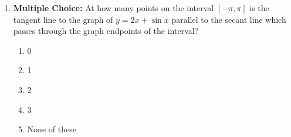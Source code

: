 \documentclass[12pt]{article}
\newif\ifans
\begin{document}
\begin{enumerate}
\ifans{\fbox{\parbox{1\linewidth}{$f^{\prime}(x)=\cos{x}-x^2$.  Firstly, notice that $f^{\prime}(x)$ is continuous for all $x$; therefore, it is continuous for all $x$ in $[0,1]$.  Secondly, notice that $f^{\prime}(0)=1>0$ and $f^{\prime}(1)=\cos{(1)}-1<0$.  Thus, the Intermediate Value Theorem states there is at least one $x_0$ in the interval $(0,1)$ with $f^{\prime}(x_0)=0$.  In other words, there is at least one $x_0$ in $(0,1)$ where $f(x)$ will have a horizontal tangent line.}}} \fi

\item {\bf Multiple Choice:} At how many points on the interval $[-\pi,\pi]$ is the tangent line to the graph of $y=2x+\sin{x}$ parallel to the secant line which passes through the graph endpoints of the interval?

\begin{enumerate}

\item 0

\item 1

\item 2

\item 3

\item None of these

\end{enumerate}

\ifans{\fbox{C}} \fi


\end{enumerate}
\end{document}
